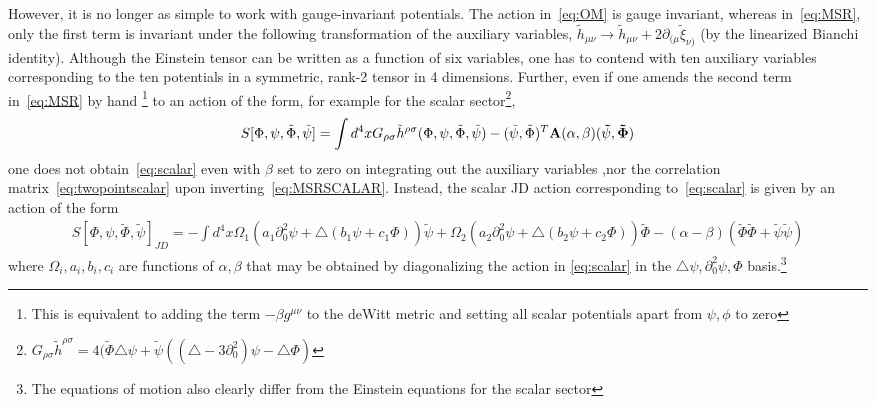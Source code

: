 \documentclass[aps,preprintnumbers,superscriptaddress,longbibliography]{revtex4-1}
\begin{document}
However, it is no longer as simple to work with gauge-invariant potentials. The action in~\eqref{eq:OM} is gauge invariant, whereas in~\eqref{eq:MSR}, only the first term is invariant under the following transformation of the auxiliary variables, $\tilde{h}_{\mu\nu}\rightarrow\tilde{h}_{\mu\nu}+2\partial_{(\mu}\tilde{\xi}_{\nu)}$ (by the linearized Bianchi identity). Although the Einstein tensor can be written as a function of six variables, one has to contend with ten auxiliary variables corresponding to the ten potentials in a symmetric, rank-2 tensor in 4 dimensions. Further, even if one amends the second term in~\eqref{eq:MSR} by hand \footnote{This is equivalent to adding the term $-\beta g^{\mu \nu}$ to the deWitt metric and setting all scalar potentials apart from $\psi,\phi$ to zero } to an action of the form, for example for the scalar sector\footnote{$G_{\rho\sigma}\tilde{h}^{\rho\sigma}=4(\tilde{\Phi}\triangle\psi+\tilde{\psi}((\triangle-3\partial_0^2)\psi-\triangle\Phi)$},
\begin{align}
    \label{eq:MSRSCALAR}S[\Phi,\psi,\tilde{\Phi},\tilde{\psi}]=\int d^4x G_{\rho\sigma}\tilde{h}^{\rho\sigma} (\Phi,\psi,\tilde{\Phi},\tilde{\psi})-(\tilde{\psi},\tilde{\Phi})^{T}\bf A(\alpha,\beta)(\tilde{\psi},\tilde{\Phi})
\end{align}
one does not obtain~\eqref{eq:scalar} even with $\beta$ set to zero on integrating out the auxiliary variables ,nor the correlation matrix~\eqref{eq:twopointscalar} upon inverting~\eqref{eq:MSRSCALAR}. Instead, the scalar JD action corresponding to~\eqref{eq:scalar} is given by an action of the form
\begin{align}
    S[\Phi,\psi,\tilde{\Phi},\tilde{\psi}]_{JD}=-\int d^4x \Omega_1(a_1\partial_0^2\psi+\triangle(b_1\psi+c_1\Phi))\tilde{\psi}+\Omega_2(a_2\partial_0^2\psi+\triangle(b_2\psi+c_2\Phi))\tilde{\Phi}-(\alpha-\beta)(\tilde{\Phi}\tilde{\Phi}+\tilde{\psi}\tilde{\psi})
\end{align}
where $\Omega_i,a_i,b_i,c_i$ are functions of $\alpha,\beta$ that may be obtained by diagonalizing the action in \eqref{eq:scalar} in the $\triangle\psi,\partial_0^2\psi,\Phi$ basis.\footnote{The equations of motion also clearly differ from the Einstein equations for the scalar sector}
\end{document}
